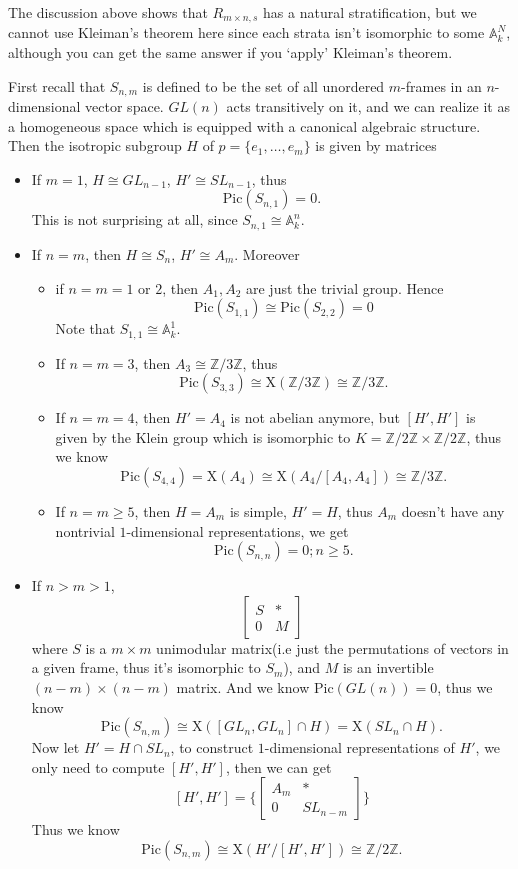 \documentclass[../main.tex]{subfiles}
\begin{document}
\begin{remark}
The discussion above shows that $R_{m\times n,s}$ has a natural stratification, but we cannot use Kleiman's theorem here since each strata isn't isomorphic to some $\mathbb{A}_{k}^{N}$, although you can get the same answer if you `apply' Kleiman's theorem. 
\end{remark}


\begin{example}
First recall that $S_{n,m}$ is defined to be the set of all unordered $m$-frames in an $n$-dimensional vector space. $GL(n)$ acts transitively on it, and we can realize it as a homogeneous space which is equipped with a canonical algebraic structure. Then the isotropic subgroup $H$ of $p=\{e_{1},\dots, e_{m}\}$ is given by matrices
\begin{itemize}
\item If $m=1$, $H\cong GL_{n-1}$, $H'\cong SL_{n-1}$, thus 
$$\mathrm{Pic}(S_{n,1})=0.$$
This is not surprising at all, since $S_{n,1}\cong \mathbb{A}_{k}^{n}$.
\item If $n=m$, then $H\cong S_{n}$, $H'\cong A_{m}$. Moreover
\begin{itemize}
\item if $n=m=1$ or $2$, then $A_{1}, A_{2}$ are just the trivial group. Hence 
$$\mathrm{Pic}(S_{1,1})\cong \mathrm{Pic}(S_{2,2})=0$$
Note that $S_{1,1}\cong \mathbb{A}_{k}^{1}$.
\item If $n=m=3$, then $A_{3}\cong \mathbb{Z}/3\mathbb{Z}$, thus 
$$\mathrm{Pic}(S_{3,3})\cong \mathrm{X}(\mathbb{Z}/3\mathbb{Z})\cong \mathbb{Z}/3\mathbb{Z}.$$
\item If $n=m=4$, then $H'=A_{4}$ is not abelian anymore, but $[H',H']$ is given by the Klein group which is isomorphic to $K=\mathbb{Z}/2\mathbb{Z}\times \mathbb{Z}/2\mathbb{Z}$, thus we know
$$\mathrm{Pic}(S_{4,4})=\mathrm{X}(A_{4})\cong \mathrm{X}(A_{4}/[A_{4},A_{4}])\cong \mathbb{Z}/3\mathbb{Z}.$$
\item If $n=m\geq 5$, then $H=A_{m}$ is simple, $H'=H$, thus $A_{m}$ doesn't have any nontrivial $1$-dimensional representations, we get 
$$\mathrm{Pic}(S_{n,n})=0; n\geq 5.$$
\end{itemize}
\item If $n>m>1$,
$$\begin{bmatrix}S & *\\
0 & M\end{bmatrix}$$
where $S$ is a $m\times m$ unimodular matrix(i.e just the permutations of vectors in a given frame, thus it's isomorphic to $S_{m}$), and $M$ is an invertible $(n-m)\times (n-m)$ matrix. And we know $\mathrm{Pic}(GL(n))=0$, thus we know
$$\mathrm{Pic}(S_{n,m})\cong \mathrm{X}([GL_{n},GL_{n}]\cap H)=\mathrm{X}(SL_{n}\cap H).$$
Now let $H'=H\cap SL_{n}$, to construct $1$-dimensional representations of $H'$, we only need to compute $[H',H']$, then we can get 
$$[H',H']=\{\begin{bmatrix}A_{m} & * \\
0 & SL_{n-m}\end{bmatrix}\}$$
Thus we know $$\mathrm{Pic}(S_{n,m})\cong \mathrm{X}(H'/[H',H'])\cong\mathbb{Z}/2\mathbb{Z}.$$
\end{itemize}
\end{example}
\end{document}
